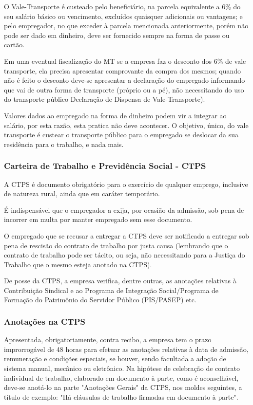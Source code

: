 \documentclass{article}
\begin{document}
O Vale-Transporte é custeado pelo beneficiário, na parcela equivalente a 6\% do seu salário básico ou vencimento, excluídos quaisquer adicionais ou vantagens; e pelo empregador, no que exceder à parcela mencionada anteriormente, porém não pode ser dado em dinheiro, deve ser fornecido sempre na forma de passe ou cartão.

\begin{tcolorbox}[title=Atenção!]
  Em uma eventual fiscalização do MT se a empresa faz o desconto dos 6\% de vale transporte, ela precisa apresentar comprovante da compra dos mesmos; quando não é feito o desconto deve-se apresentar a declaração do empregado informando que vai de outra forma de transporte (próprio ou a pé), não necessitando do uso do transporte público Declaração de Dispensa de Vale-Transporte).
\end{tcolorbox}

Valores dados ao empregado na forma de dinheiro podem vir a integrar ao salário, por esta razão, esta pratica não deve acontecer. O objetivo, único, do vale transporte é custear o transporte público para o empregado se deslocar da sua residência para o trabalho, e nada mais.

\subsubsection{Carteira de Trabalho e Previdência Social - CTPS}
\label{adm:ctps}
A CTPS é documento obrigatório para o exercício de qualquer emprego, inclusive de natureza rural, ainda que em caráter temporário. 

É indispensável que o empregador a exija, por ocasião da admissão, sob pena de incorrer em multa por manter empregado sem esse documento.

O empregado que se recusar a entregar a CTPS deve ser notificado a entregar sob pena de rescisão do contrato de trabalho por justa causa (lembrando que o contrato de trabalho pode ser tácito, ou seja, não necessitando para a Justiça do Trabalho que o mesmo esteja anotado na CTPS).

De posse da CTPS, a empresa verifica, dentre outras, as anotações relativas à Contribuição Sindical e ao Programa de Integração Social/Programa de Formação do Patrimônio do Servidor Público (PIS/PASEP) etc.

\subsubsection{Anotações na CTPS}
\label{adm:notes}
Apresentada, obrigatoriamente, contra recibo, a empresa tem o prazo improrrogável de 48 horas para efetuar as anotações relativas à data de admissão, remuneração e condições especiais, se houver, sendo facultada a adoção de sistema manual, mecânico ou eletrônico. 
Na hipótese de celebração de contrato individual de trabalho, elaborado em documento à parte, como é aconselhável, deve-se anotá-lo na parte "Anotações Gerais" da CTPS, nos moldes seguintes, a título de exemplo: "Há cláusulas de trabalho firmadas em documento à parte".
\end{document}
